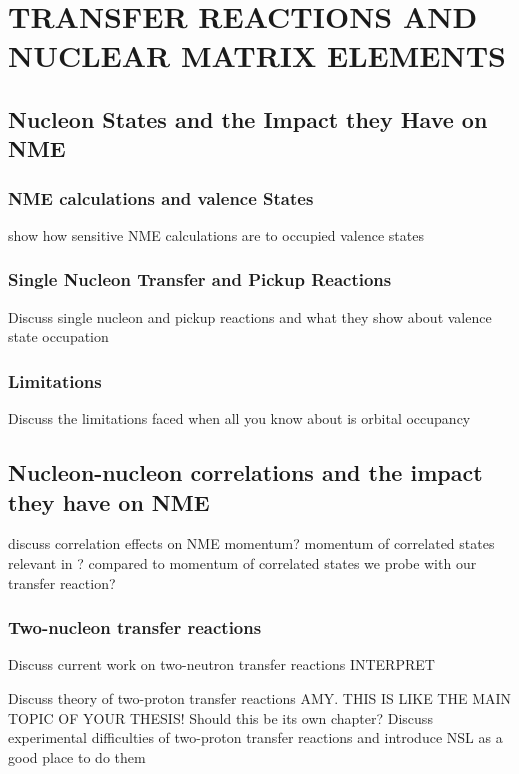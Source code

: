%
%
%
%
%
%
%
%

%
%

\chapter{TRANSFER REACTIONS AND NUCLEAR MATRIX ELEMENTS}
\label{chap:nucl}

\section{Nucleon States and the Impact they Have on NME}
\subsection{NME calculations and valence States}
show how sensitive NME calculations are to occupied valence states

\subsection{Single Nucleon Transfer and Pickup Reactions}
Discuss single nucleon and pickup reactions and what they show about valence state occupation

\subsection{Limitations}
Discuss the limitations faced when all you know about is orbital occupancy

\section{Nucleon-nucleon correlations and the impact they have on NME}
discuss correlation effects on NME
momentum?  momentum of correlated states relevant in \zvbb? compared to momentum of correlated states we probe with our transfer reaction?

\subsection{Two-nucleon transfer reactions}
Discuss current work on two-neutron transfer reactions
INTERPRET

Discuss theory of two-proton transfer reactions
AMY.  THIS IS LIKE THE MAIN TOPIC OF YOUR THESIS!  Should this be its own chapter?
Discuss experimental difficulties of two-proton transfer reactions and introduce NSL as a good place to do them

%
% 
% 
